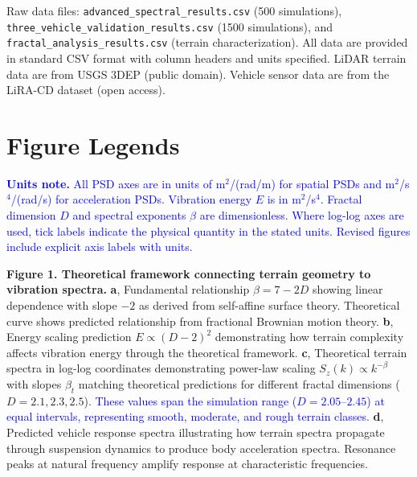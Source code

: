 \documentclass[11pt]{article}
\begin{document}
Raw data files: \texttt{advanced\_spectral\_results.csv} (500 simulations), \texttt{three\_\allowbreak vehicle\_\allowbreak validation\_\allowbreak results.csv} (1500 simulations), and \texttt{fractal\_\allowbreak analysis\_\allowbreak results.csv} (terrain characterization). All data are provided in standard CSV format with column headers and units specified. LiDAR terrain data are from USGS 3DEP (public domain). Vehicle sensor data are from the LiRA-CD dataset (open access).




\section*{Figure Legends}

\textcolor{blue}{\textbf{Units note.} All PSD axes are in units of m$^2$/(rad/m) for spatial PSDs and m$^2$/s$^4$/(rad/s) for acceleration PSDs. Vibration energy $E$ is in m$^2$/s$^4$. Fractal dimension $D$ and spectral exponents $\beta$ are dimensionless. Where log-log axes are used, tick labels indicate the physical quantity in the stated units. Revised figures include explicit axis labels with units.}

\textbf{Figure 1. Theoretical framework connecting terrain geometry to vibration spectra.} 
\textbf{a}, Fundamental relationship $\beta = 7-2D$ showing linear dependence with slope $-2$ as derived from self-affine surface theory. Theoretical curve shows predicted relationship from fractional Brownian motion theory. 
\textbf{b}, Energy scaling prediction $E \propto (D-2)^2$ demonstrating how terrain complexity affects vibration energy through the theoretical framework.
\textbf{c}, Theoretical terrain spectra in log-log coordinates demonstrating power-law scaling $S_z(k) \propto k^{-\beta}$ with slopes $\beta_t$ matching theoretical predictions for different fractal dimensions ($D = 2.1, 2.3, 2.5$). \textcolor{blue}{These values span the simulation range ($D = 2.05$--$2.45$) at equal intervals, representing smooth, moderate, and rough terrain classes.}
\textbf{d}, Predicted vehicle response spectra illustrating how terrain spectra propagate through suspension dynamics to produce body acceleration spectra. Resonance peaks at natural frequency amplify response at characteristic frequencies.
\end{document}
